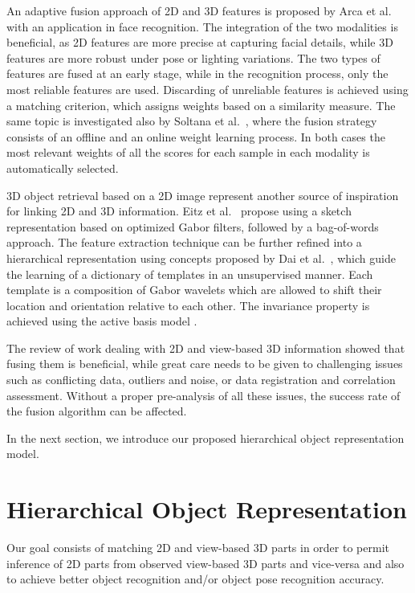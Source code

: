 \documentclass[runningheads]{llncs}
\begin{document}
An adaptive fusion approach of 2D and 3D features is proposed by Arca et al.~\cite{Arca2007} with an application in face recognition. The integration of the two modalities is beneficial, as 2D features are more precise at capturing facial details, while 3D features are more robust under pose or lighting variations. The two types of features are fused at an early stage, while in the recognition process, only the most reliable features are used. Discarding of unreliable features is achieved using a matching criterion, which assigns weights based on a similarity measure. The same topic is investigated also by Soltana et al.~\cite{Soltana2010}, where the fusion strategy consists of an offline and an online weight learning process. In both cases the most relevant weights of all the scores for each sample in each modality is automatically selected.

3D object retrieval based on a 2D image represent another source of inspiration for linking 2D and 3D information. Eitz et al.~\cite{Eitz2012} propose using a sketch representation based on optimized Gabor filters, followed by a bag-of-words approach. The feature extraction technique can be further refined into a hierarchical representation using concepts proposed by Dai et al.~\cite{Dai2014}, which guide the learning of a dictionary of templates in an unsupervised manner. Each template is a composition of Gabor wavelets which are allowed to shift their location and orientation relative to each other. The invariance property is achieved using the active basis model \cite{Wu2010}.

The review of work dealing with 2D and view-based 3D information showed that fusing them is beneficial, while great care needs to be given to challenging issues such as conflicting data, outliers and noise, or data registration and correlation assessment. Without a proper pre-analysis of all these issues, the success rate of the fusion algorithm can be affected. 

In the next section, we introduce our proposed hierarchical object representation model.  

\section{Hierarchical Object Representation} 
\label{sec:learning}    

Our goal consists of matching 2D and view-based 3D parts in order to permit inference of 2D parts from observed view-based 3D parts and vice-versa and also to achieve better object recognition and/or object pose recognition accuracy.  
\end{document}
